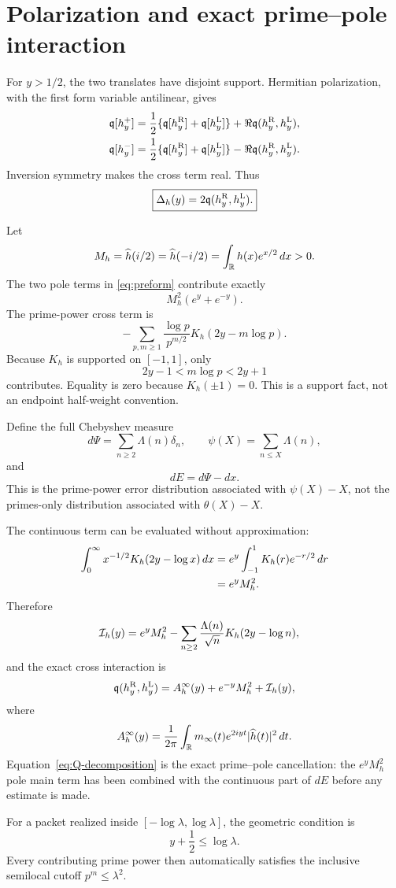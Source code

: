 \section{Polarization and exact prime--pole interaction}
\label{sec:interaction}

For \(y>1/2\), the two translates have disjoint support.  Hermitian
polarization, with the first form variable antilinear, gives
\begin{align*}
\mathfrak q[h_y^+]
&=\frac12\{\mathfrak q[h_y^{\mathrm R}]+\mathfrak q[h_y^{\mathrm L}]\}
+\Re\mathfrak q(h_y^{\mathrm R},h_y^{\mathrm L}),\\
\mathfrak q[h_y^-]
&=\frac12\{\mathfrak q[h_y^{\mathrm R}]+\mathfrak q[h_y^{\mathrm L}]\}
-\Re\mathfrak q(h_y^{\mathrm R},h_y^{\mathrm L}).
\end{align*}
Inversion symmetry makes the cross term real.  Thus
\begin{equation}
\boxed{\Delta_h(y)=2\mathfrak q(h_y^{\mathrm R},h_y^{\mathrm L}).}
\label{eq:polarization}
\end{equation}

Let
\[
M_h=\widehat h(i/2)=\widehat h(-i/2)
=\int_\mathbb R h(x)e^{x/2}\,dx>0.
\]
The two pole terms in \eqref{eq:preform} contribute exactly
\begin{equation}
M_h^2(e^y+e^{-y}).
\label{eq:pole-cross}
\end{equation}
The prime-power cross term is
\begin{equation}
-
\sum_{p,m\ge1}
\frac{\log p}{p^{m/2}}
K_h(2y-m\log p).
\label{eq:prime-cross}
\end{equation}
Because \(K_h\) is supported on \([-1,1]\), only
\[
2y-1<m\log p<2y+1
\]
contributes.  Equality is zero because \(K_h(\pm1)=0\).  This is a support
fact, not an endpoint half-weight convention.

Define the full Chebyshev measure
\[
d\Psi=\sum_{n\ge2}\Lambda(n)\delta_n,\qquad
\psi(X)=\sum_{n\le X}\Lambda(n),
\]
and
\[
dE=d\Psi-dx.
\]
This is the prime-power error distribution associated with
\(\psi(X)-X\), not the primes-only distribution associated with
\(\theta(X)-X\).

The continuous term can be evaluated without approximation:
\begin{align}
\int_0^\infty
x^{-1/2}K_h(2y-\log x)\,dx
&=
e^y\int_{-1}^{1}K_h(r)e^{-r/2}\,dr
\notag\\
&=e^yM_h^2.
\label{eq:continuous-main}
\end{align}
Therefore
\begin{align}
\mathcal I_h(y)
&=
e^yM_h^2
-
\sum_{n\ge2}
\frac{\Lambda(n)}{\sqrt n}
K_h(2y-\log n),
\label{eq:I-physical}
\end{align}
and the exact cross interaction is
\begin{equation}
\mathfrak q(h_y^{\mathrm R},h_y^{\mathrm L})
=
A_h^\infty(y)+e^{-y}M_h^2+\mathcal I_h(y),
\label{eq:Q-decomposition}
\end{equation}
where
\[
A_h^\infty(y)
=
\frac{1}{2\pi}
\int_\mathbb R m_\infty(t)e^{2iyt}|\widehat h(t)|^2\,dt.
\]
Equation~\eqref{eq:Q-decomposition} is the exact prime--pole cancellation:
the \(e^yM_h^2\) pole main term has been combined with the continuous part
of \(dE\) before any estimate is made.

For a packet realized inside
\([-\log\lambda,\log\lambda]\), the geometric condition is
\[
y+\frac12\le\log\lambda.
\]
Every contributing prime power then automatically satisfies the inclusive
semilocal cutoff \(p^m\le\lambda^2\).
